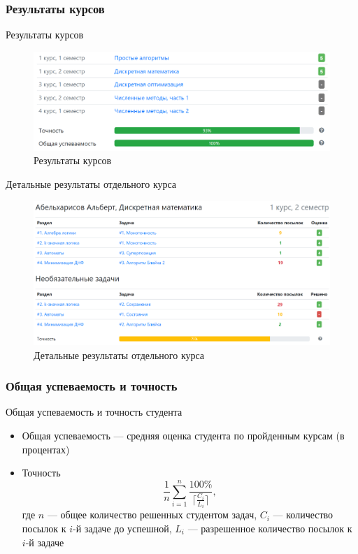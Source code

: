 \documentclass[10pt,pdf,hyperref={unicode}]{beamer}
\begin{document}
\subsubsection{Результаты курсов}
\begin{frame}{Результаты курсов}
    \begin{figure}
        \includegraphics[scale=0.25]{account-courses-results}
        \caption{Результаты курсов}
        \centering
    \end{figure}
\end{frame}
\begin{frame}{Детальные результаты отдельного курса}
    \begin{figure}
        \includegraphics[scale=0.19]{account-course-results}
        \caption{Детальные результаты отдельного курса}
        \centering
    \end{figure}
\end{frame}
\subsubsection{Общая успеваемость и точность}
\begin{frame}{Общая успеваемость и точность студента}
    \begin{itemize}
        \item Общая успеваемость --- средняя оценка студента по пройденным курсам (в процентах)
        \item {
            Точность
            $$\frac{1}{n} \sum_{i=1}^{n} \frac{100\%}{\lceil \frac{C_i}{L_i} \rceil},$$
            где $n$ --- общее количество решенных студентом задач, $C_i$ --- количество посылок к $i$-й задаче до успешной, $L_i$ --- разрешенное количество посылок к $i$-й задаче
        }
    \end{itemize}
\end{frame}
\end{document}
